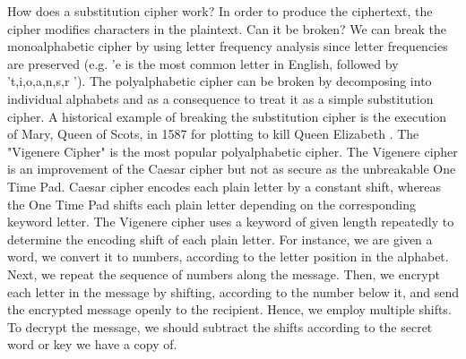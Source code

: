 How does a substitution cipher work? In order to produce the ciphertext, the cipher modifies characters in the plaintext. Can it be broken? We can break the monoalphabetic cipher by using letter frequency analysis since letter frequencies are preserved (e.g. 'e is the most common letter in English, followed by 't,i,o,a,n,s,r '). The polyalphabetic cipher can be broken by decomposing into individual alphabets and as a consequence to treat it as a simple substitution cipher. A historical example of breaking the substitution cipher is the execution of Mary, Queen of Scots, in 1587 for plotting to kill Queen Elizabeth \cite{maryscots}. The "Vigenere Cipher" is the most popular polyalphabetic cipher. The Vigenere cipher is an improvement of the Caesar cipher but not as secure as the unbreakable One Time Pad. Caesar cipher encodes each plain letter by a constant shift, whereas the One Time Pad shifts each plain letter depending on the corresponding keyword letter. The Vigenere cipher uses a keyword of given length repeatedly to determine the encoding shift of each plain letter. For instance, we are given a word, we convert it to numbers, according to the letter position in the alphabet. Next, we repeat the sequence of numbers along the message. Then, we encrypt each letter in the message by shifting, according to the number below it, and send the encrypted message openly to the recipient. Hence, we employ multiple shifts. To decrypt the message, we should subtract the shifts according to the secret word or key we have a copy of.


